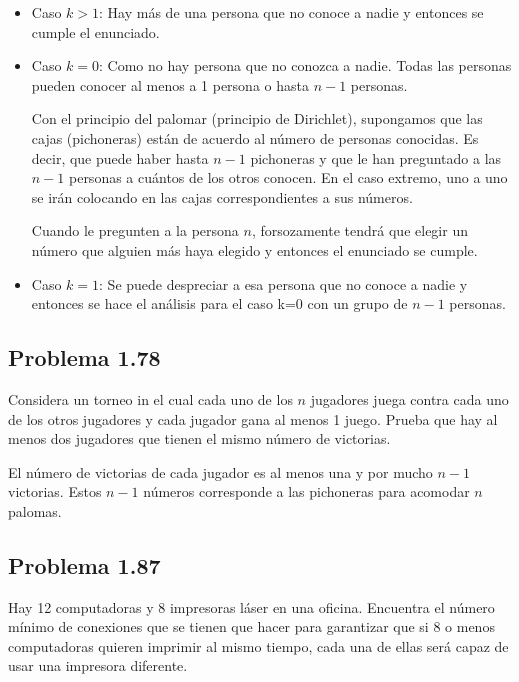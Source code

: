 \documentclass[12pt]{article}
\begin{document}
\begin{itemize}
\item Caso $k>1$: Hay m\'as de una persona que no conoce a nadie y entonces se
cumple el enunciado.
	
\item Caso $k=0$: Como no hay persona que no conozca a nadie. Todas las personas
pueden conocer al menos a 1 persona o hasta $n-1$ personas. 
	
Con el principio del palomar (principio de Dirichlet), supongamos que las cajas
(pichoneras) están de acuerdo al n\'umero de personas conocidas. Es decir, que
puede haber hasta $n-1$ pichoneras y que le han preguntado a las $n-1$ personas
a cuántos de los otros conocen. En el caso extremo, uno a uno se ir\'an
colocando en las cajas correspondientes a sus n\'umeros.
	
Cuando le pregunten a la persona $n$, forsozamente tendr\'a que elegir un
n\'umero que alguien m\'as haya elegido y entonces el enunciado se cumple. 
	
\item Caso $k=1$: Se puede despreciar a esa persona que no conoce a nadie y
entonces se hace el an\'alisis para el caso k=0 con un grupo de $n-1$ personas.

\end{itemize}

\subsection*{Problema 1.78}

Considera un torneo in el cual cada uno de los $n$ jugadores juega contra cada
uno de los otros jugadores y cada jugador gana al menos 1 juego. Prueba que hay
al menos dos jugadores que tienen el mismo n\'umero de victorias.

El n\'umero de victorias de cada jugador es al menos una y por mucho $n-1$
victorias. Estos $n-1$ n\'umeros corresponde a las pichoneras para acomodar $n$
palomas.

\subsection*{Problema 1.87}
Hay 12 computadoras y 8 impresoras l\'aser en una oficina. Encuentra el n\'umero
m\'inimo de conexiones que se tienen que hacer para garantizar que si 8 o menos
computadoras quieren imprimir al mismo tiempo, cada una de ellas ser\'a capaz de
usar una impresora diferente.\\
\end{document}

